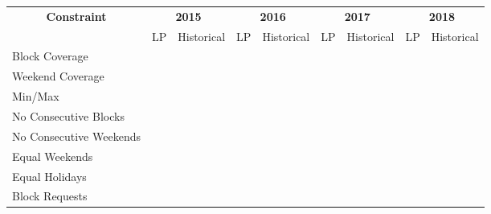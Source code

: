 \begin{table}[h]
	\centering
    \begin{tabular}{l|cc|cc|cc|cc}
    	\hline
    	\multicolumn{1}{c|}{\multirow{2}[1]{*}{\textbf{Constraint}}} & \multicolumn{2}{c|}{\textbf{2015}} & \multicolumn{2}{c|}{\textbf{2016}} & \multicolumn{2}{c|}{\textbf{2017}} & \multicolumn{2}{c}{\textbf{2018}} \\
    	                                                             &     LP     &      Historical       &     LP     &      Historical       &     LP     &      Historical       &     LP     &      Historical      \\ \midrule
    	Block Coverage                                               & \checkmark &      \checkmark       & \checkmark &      \checkmark       & \checkmark &      \checkmark       & \checkmark &      \checkmark      \\
    	Weekend Coverage                                             & \checkmark &      \checkmark       & \checkmark &      \checkmark       & \checkmark &      \checkmark       & \checkmark &      \checkmark      \\
    	Min/Max                                                      & \checkmark &      \checkmark       & \checkmark &      \checkmark       & \checkmark &      \checkmark       & \checkmark &      \checkmark      \\
    	No Consecutive Blocks                                        & \checkmark &                       & \checkmark &                       & \checkmark &                       & \checkmark &                      \\
    	No Consecutive Weekends                                      & \checkmark &                       & \checkmark &                       & \checkmark &      \checkmark       & \checkmark &      \checkmark      \\
    	Equal Weekends                                               & \checkmark &                       & \checkmark &                       & \checkmark &                       & \checkmark &                      \\
    	Equal Holidays                                               & \checkmark &                       & \checkmark &      \checkmark       & \checkmark &                       & \checkmark &      \checkmark      \\ \hline
    	Block Requests                                               &            &                       &            &                       &            &                       &            &                      \\

\end{tabular}
\end{table}

